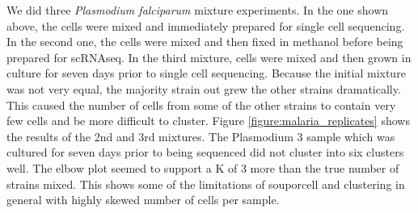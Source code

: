 \par{
We did three \textit{Plasmodium falciparum} mixture experiments. In the one shown above, the cells were mixed and immediately prepared for single cell sequencing. In the second one, the cells were mixed and then fixed in methanol before being prepared for scRNAseq. In the third mixture, cells were mixed and then grown in culture for seven days prior to single cell sequencing. Because the initial mixture was not very equal, the majority strain out grew the other strains dramatically. This caused the number of cells from some of the other strains to contain very few cells and be more difficult to cluster. Figure \ref{figure:malaria_replicates} shows the results of the 2nd and 3rd mixtures. The Plasmodium 3 sample which was cultured for seven days prior to being sequenced did not cluster into six clusters well. The elbow plot seemed to support a K of 3 more than the true number of strains mixed. This shows some of the limitations of souporcell and clustering in general with highly skewed number of cells per sample.
}



